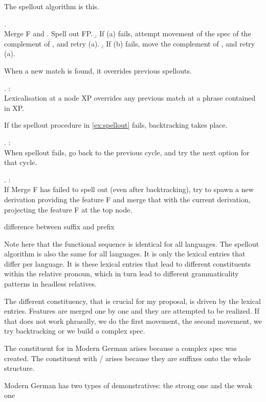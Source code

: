 The spellout algorithm is this.

\ex. \\
Merge F and \label{ex:spellout}
 \a. Spell out FP.
 \b. If (a) fails, attempt movement of the spec of the complement of , and retry (a).
 \b. If (b) fails, move the complement of , and retry (a).

When a new match is found, it overrides previous spellouts.

\ex.  \citep{starke2018}:\\
Lexicalisation at a node XP overrides any previous match at a phrase contained in XP.

If the spellout procedure in \ref{ex:spellout} fails, backtracking takes place.

\ex.  \citep{starke2018}:\\
When spellout fails, go back to the previous cycle, and try the next option for that cycle.\label{ex:backtracking}

\ex.  \citep{starke2018}:\\
If Merge F has failed to spell out (even after backtracking), try to spawn a new derivation providing the feature F and merge that with the current derivation, projecting the feature F at the top node.\label{ex:specformation}

difference between suffix and prefix

Note here that the functional sequence is identical for all languages. The spellout algorithm is also the same for all languages. It is only the lexical entries that differ per language. It is these lexical entries that lead to different constituents within the relative pronoun, which in turn lead to different grammaticality patterns in headless relatives.

The different constituency, that is crucial for my proposal, is driven by the lexical entries. Features are merged one by one and they are attempted to be realized. If that does not work phrasally, we do the first movement, the second movement, we try backtracking or we build a complex spec.

The constituent for  in Modern German arises because a complex spec was created. The constituent with / arises because they are suffixes onto the whole structure.





Modern German has two types of demonstratives: the strong one and the weak one

